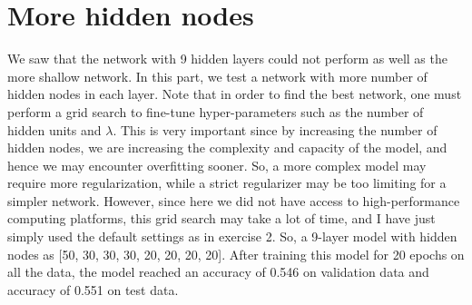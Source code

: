 \documentclass[a4paper]{article}
\begin{document}
\section{More hidden nodes}
We saw that the network with 9 hidden layers could not perform as well as the more shallow network. In this part, we test a network with more number of hidden nodes in each layer. Note that in order to find the best network, one must perform a grid search to fine-tune hyper-parameters such as the number of hidden units and $\lambda$. This is very important since by increasing the number of hidden nodes, we are increasing the complexity and capacity of the model, and hence we may encounter overfitting sooner. So, a more complex model may require more regularization, while a strict regularizer may be too limiting for a simpler network. However, since here we did not have access to high-performance computing platforms, this grid search may take a lot of time, and I have just simply used the default settings as in exercise 2. 
So, a 9-layer model with hidden nodes as [50, 30, 30, 30, 20, 20, 20, 20]. After training this model for 20 epochs on all the data, the model reached an accuracy of 0.546 on validation data and accuracy of 0.551 on test data.







\end{document}
